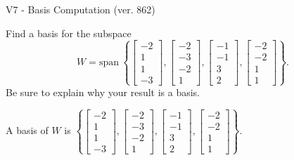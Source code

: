 \begin{exercise}
  \begin{exerciseTitle}V7 - Basis Computation (ver. 862)\end{exerciseTitle}
  \begin{exerciseStatement}
    Find a basis for the subspace 
\[W=\mathrm{span}\ \left\{\left[\begin{array}{r}
-2 \\
1 \\
1 \\
-3
\end{array}\right] , \left[\begin{array}{r}
-2 \\
-3 \\
-2 \\
1
\end{array}\right] , \left[\begin{array}{r}
-1 \\
-1 \\
3 \\
2
\end{array}\right] , \left[\begin{array}{r}
-2 \\
-2 \\
1 \\
1
\end{array}\right]\right\}.\]
 Be sure to explain why your result is a basis.


  \end{exerciseStatement}
  \begin{exerciseAnswer}
   A basis of \(W\) is  \(\left\{\left[\begin{array}{r}
-2 \\
1 \\
1 \\
-3
\end{array}\right] , \left[\begin{array}{r}
-2 \\
-3 \\
-2 \\
1
\end{array}\right] , \left[\begin{array}{r}
-1 \\
-1 \\
3 \\
2
\end{array}\right] , \left[\begin{array}{r}
-2 \\
-2 \\
1 \\
1
\end{array}\right]\right\}\).
  


  \end{exerciseAnswer}
\end{exercise}